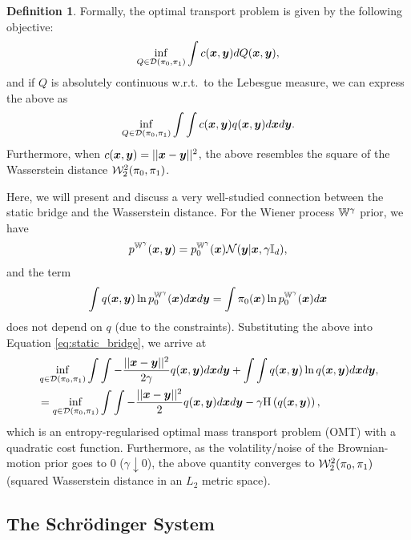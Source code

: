 \documentclass[a4paper,12pt,twoside,openright]{report}
\theoremstyle{definition}
\newtheorem{definition}{Definition}[section]
\begin{document}
\begin{definition}
Formally, the optimal transport problem is given by the following objective:
\begin{align*}
\inf_{Q \in {\mathcal{D}}(\pi_0, \pi_1)}\int  c({\bm{x}}, {\bm{y}}) dQ({\bm{x}}, {\bm{y}}),
\end{align*}
and if $Q$ is absolutely continuous w.r.t.\ to the Lebesgue measure, we can express the above as
\begin{align*}
\inf_{Q \in {\mathcal{D}}(\pi_0, \pi_1)}\int \int c({\bm{x}}, {\bm{y}}) q({\bm{x}}, {\bm{y}}) d{\bm{x}} d{\bm{y}}.
\end{align*}
Furthermore, when $ c({\bm{x}}, {\bm{y}}) = || {\bm{x}} - {\bm{y}}||^2$, the above resembles the square of the Wasserstein distance ${\mathcal{W}}^2_{2}(\pi_0, \pi_1)$.
\end{definition}

Here, we will present and discuss a very well-studied \citep{mikami2008optimal,leonard2012schrodinger,leonard2013survey,carlier2017convergence} connection between the static bridge and the Wasserstein distance.  For the Wiener process $\mathbb{W}^\gamma$ prior, we have
\begin{align}
    p^{\mathbb{W}^{\gamma}}({\bm{x}},{\bm{y}}) = p^{\mathbb{W}^{\gamma}}_0({\bm{x}}){\mathcal{N}}({\bm{y}} | {\bm{x}}, \gamma{\mathbb{I}_d}),
\end{align}
and the term
\begin{align*}
    \int q({\bm{x}}, {\bm{y}})\ln  p^{\mathbb{W}^{\gamma}}_0({\bm{x}}) d{\bm{x}} d{\bm{y}} =  \int \pi_0({\bm{x}}) \ln  p^{\mathbb{W}^{\gamma}}_0({\bm{x}}) d{\bm{x}} 
\end{align*}
does not depend on $q$ (due to the constraints). Substituting the above into Equation \ref{eq:static_bridge}, we arrive at
\begin{align}
    &\inf _{q \in {\mathcal{D}}(\pi_0, \pi_1)}\int \int -\frac{||{\bm{x}} - {\bm{y}} ||^2}{2\gamma} q({\bm{x}}, {\bm{y}}) d{\bm{x}} d{\bm{y}}  + \int \int q({\bm{x}}, {\bm{y}}) \ln q({\bm{x}}, {\bm{y}}) d{\bm{x}} d{\bm{y}}, \nonumber \\
    &=\inf _{q \in {\mathcal{D}}(\pi_0, \pi_1)}\int \int -\frac{||{\bm{x}} - {\bm{y}} ||^2}{2} q({\bm{x}}, {\bm{y}}) d{\bm{x}} d{\bm{y}}  - \gamma \text{H} \left(q({\bm{x}}, {\bm{y}})\right),
\end{align}
which is an entropy-regularised optimal mass transport problem (OMT) \citep{villani2003topics} with a quadratic cost function. Furthermore, as the volatility/noise of the Brownian-motion prior goes to 0 ($\gamma \downarrow 0$), the above quantity converges to ${\mathcal{W}}^2_{2}(\pi_0, \pi_1)$ (squared Wasserstein distance in an $L_2$ metric space).
\subsection{The Schrödinger System}
\end{document}
